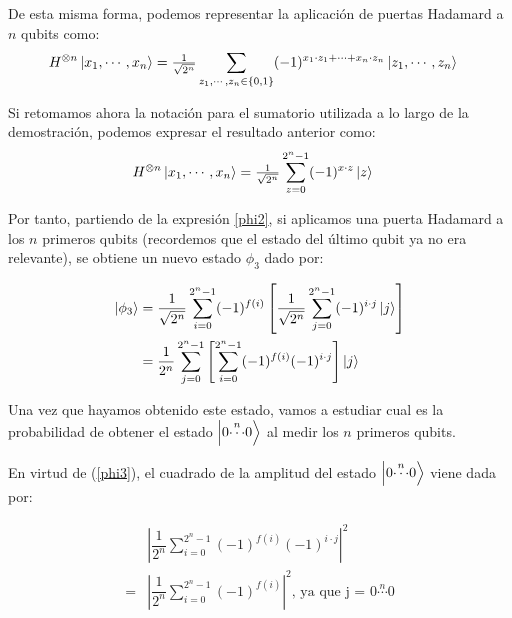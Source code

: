 De esta misma forma, podemos representar la aplicación de puertas Hadamard a $n$ qubits como:
\begin{equation}
\begin{split}
H^{\otimes n}\left|x_1,\cdots,x_n\right\rangle & = \tfrac{1}{\sqrt{2^n}}\sum\limits_{z_1,\cdots,z_n\in\{0,1\}} (-1)^{x_1\cdot z_1+\cdots+x_n\cdot z_n}\left|z_1,\cdots,z_n\right\rangle
\end{split}
\end{equation}

Si retomamos ahora la notación para el sumatorio utilizada a lo largo de la demostración, podemos expresar el resultado anterior como:
\begin{equation}
\begin{split}
H^{\otimes n}\left|x_1,\cdots,x_n\right\rangle & = \tfrac{1}{\sqrt{2^n}}\sum\limits_{z=0}^{2^n-1} (-1)^{x\cdot z}\left|z\right\rangle
\end{split}
\end{equation}

Por tanto, partiendo de la expresión \ref{phi2}, si aplicamos una puerta Hadamard a los $n$ primeros qubits (recordemos que el estado del último qubit ya no era relevante),
se obtiene un nuevo estado $\phi_3$ dado por:

\begin{equation}
\begin{split}
\left|\phi_3\right\rangle & = \dfrac{1}{\sqrt{2^{n}}} \sum\limits_{i=0}^{2^n - 1} (-1)^{f(i)}\left[\dfrac{1}{\sqrt{2^{n}}}\sum\limits_{j=0}^{2^n - 1}(-1)^{i\cdot j}\left|j\right\rangle\right] \\
& = \dfrac{1}{2^n}\sum\limits_{j=0}^{2^n - 1}\left[\sum\limits_{i=0}^{2^n - 1}(-1)^{f(i)}(-1)^{i\cdot j}\right]\left|j\right\rangle
\end{split}
\label{phi3}
\end{equation}

Una vez que hayamos obtenido este estado, vamos a estudiar cual es la probabilidad de obtener el estado $\left|0\overset{n}{\cdots}0\right\rangle$ al medir los $n$ primeros qubits.

En virtud de (\ref{phi3}), el cuadrado de la amplitud del estado $\left|0\overset{n}{\cdots}0\right\rangle$ viene dada por:

\begin{equation}
\begin{split}
& \left|\dfrac{1}{2^n}\sum\limits_{i=0}^{2^n - 1}(-1)^{f(i)}(-1)^{i\cdot j}\right|^2 \\ 
= &\left|\dfrac{1}{2^n}\sum\limits_{i=0}^{2^n - 1}(-1)^{f(i)}\right|^2 \textrm{, ya que j = $0\overset{n}{\cdots}0$}
\end{split}
\end{equation}

